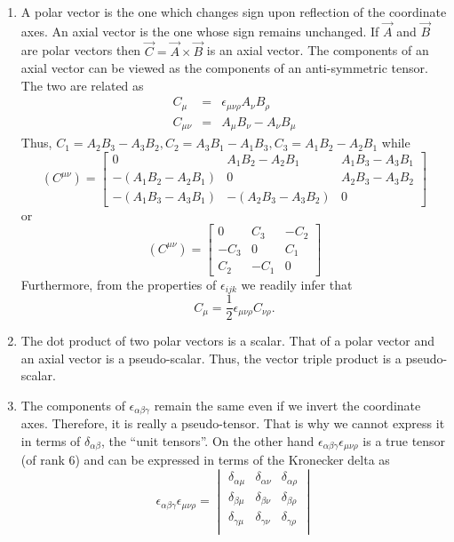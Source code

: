 \begin{enumerate}
\item A polar vector is the one which changes sign upon reflection of the 
coordinate axes. An axial vector is the one whose sign remains unchanged. If 
$\vec{A}$ and $\vec{B}$ are polar vectors then $\vec{C} = \vec{A} \times 
\vec{B}$ is an axial vector. The components of an axial vector can be viewed 
as the components of an anti-symmetric tensor. The two are related as 
\begin{eqnarray}
C_\mu &=& \epsilon_{\mu\nu\rho}A_\nu B_\rho \label{c1e55} \\
C_{\mu\nu} &=& A_\mu B_\nu - A_\nu B_\mu \label{c1e56}
\end{eqnarray}
Thus, $C_1 = A_2B_3 - A_3B_2, C_2 = A_3B_1 - A_1B_3, C_3 = A_1B_2 - A_2B_1$ 
while
\begin{equation}\label{c1e57}
(C^{\mu\nu}) = \begin{bmatrix}0 & A_1B_2 - A_2B_1 & A_1B_3 - A_3B_1 \\
-(A_1B_2 - A_2B_1) & 0 & A_2B_3 - A_3B_2 \\
-(A_1B_3 - A_3B_1) & -(A_2B_3 - A_3B_2) & 0
\end{bmatrix}
\end{equation}
or
\begin{equation}\label{c1e58}
(C^{\mu\nu})=\begin{bmatrix}0 & C_3 & -C_2 \\ -C_3 & 0 & C_1 \\ C_2 & -C_1 & 0
\end{bmatrix}
\end{equation}
Furthermore, from the properties of $\epsilon_{ijk}$ we readily infer that
\begin{equation}\label{c1e59}
C_\mu = \frac{1}{2}\epsilon_{\mu\nu\rho}C_{\nu\rho}.
\end{equation}

\item The dot product of two polar vectors is a scalar. That of a polar vector
and an axial vector is a pseudo-scalar. Thus, the vector triple product is a
pseudo-scalar.

\item The components of $\epsilon_{\alpha\beta\gamma}$ remain the same even if 
we invert the coordinate axes. Therefore, it is really a pseudo-tensor. That 
is why we cannot express it in terms of $\delta_{\alpha\beta}$, the ``unit 
tensors''. On the other hand $\epsilon_{\alpha\beta\gamma}\epsilon_{\mu\nu\rho}$ 
is a true tensor (of rank $6$) and can be expressed in terms of the Kronecker 
delta as
\begin{equation}\label{c1e60}
\epsilon_{\alpha\beta\gamma}\epsilon_{\mu\nu\rho} = \begin{vmatrix}
\delta_{\alpha\mu} & \delta_{\alpha\nu} & \delta_{\alpha\rho} \\
\delta_{\beta\mu} & \delta_{\beta\nu} & \delta_{\beta\rho} \\
\delta_{\gamma\mu} & \delta_{\gamma\nu} & \delta_{\gamma\rho} \\
\end{vmatrix}
\end{equation}


\end{enumerate}
